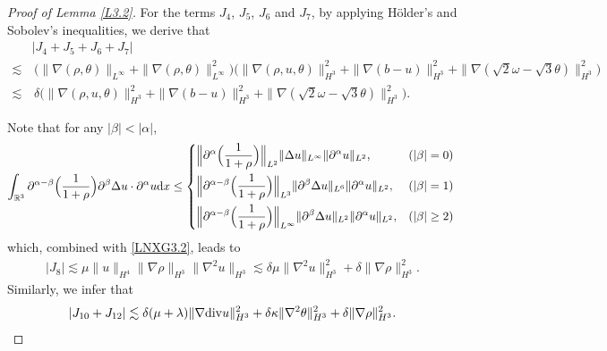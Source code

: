 \documentclass[reqno,11pt]{amsart}
\theoremstyle{plain}
\numberwithin{equation}{section}
\begin{document}
\begin{proof}[Proof of Lemma \ref{L3.2}]
For the terms $J_4$, $J_5$, $J_6$ and $J_7$, by applying H\"{o}lder's and Sobolev’s inequalities, we   derive that
\begin{align}\label{G3.13}
 &|J_4+J_5+J_6+J_7|\nonumber\\
 \lesssim &\,    \big(\|\nabla(\rho,\theta)\|_{L^\infty} +\|\nabla(\rho,\theta)\|_{L^\infty}^2\big) \big(\|\nabla (\rho,u,\theta)\|_{H^3}^2+\|\nabla(b-u)\|_{H^3}^2+\|\nabla(\sqrt{2}\omega-\sqrt{3}\theta)\|_{H^3}^2 \big)\nonumber\\
 \lesssim&\, \delta \big(\|\nabla (\rho,u,\theta)\|_{H^3}^2+\|\nabla(b-u)\|_{H^3}^2+\|\nabla(\sqrt{2}\omega-\sqrt{3}\theta)\|_{H^3}^2 \big). 
\end{align} 

Note that for any $|\beta|<|\alpha|$,
\begin{equation*}
\int_{\mathbb{R}^3}\partial^{\alpha-\beta}
\Big(\frac{1}{1+\rho}\Big)\partial^{\beta}\Delta u\cdot\partial^{\alpha}u{\rm d}x
\leq \left\{\begin{aligned} 
&\Big\|\partial^{\alpha}\Big(\frac{1}{1+\rho}\Big)\Big\|_{L^2}
\|\Delta u\|_{L^{\infty}}\|\partial^{\alpha}u\|_{L^2},
& (|\beta|=0)\\
&\Big\|\partial^{\alpha-\beta}\Big(\frac{1}{1+\rho}\Big)\Big\|_{L^{3}}\|\partial^{\beta}\Delta u\|_{L^{6}}
\|\partial^{\alpha}u\|_{L^2},& (|\beta|=1)\\
&\Big\|\partial^{\alpha-\beta}\Big(\frac{1}{1+\rho}\Big)\Big\|_{L^{\infty}}\|\partial^{\beta}\Delta u\|_{L^2}
\|\partial^{\alpha}u\|_{L^2},&  (|\beta|\geq 2)
\end{aligned}\right.\nonumber\\
\end{equation*}
which, combined with \eqref{LNXG3.2}, leads to 
\begin{align}\label{G3.14}
|J_8|\lesssim \mu \|u\|_{H^4} \|\nabla \rho\|_{H^3} \|\nabla^2 u\|_{H^3}  \lesssim \delta \mu \|\nabla^2 u\|_{H^3}^2+\delta \|\nabla\rho\|_{H^3}^2.
\end{align}
Similarly, we infer that
\begin{align}\label{G3.15}
|J_{10}+J_{12}|\lesssim \delta(\mu+\lambda)\|\nabla{\rm div} u\|_{H^3}^2+\delta\kappa \|\nabla^2\theta\|_{H^3}^2+\delta \|\nabla\rho\|_{H^3}^2.    
\end{align}


\end{proof}
\end{document}
